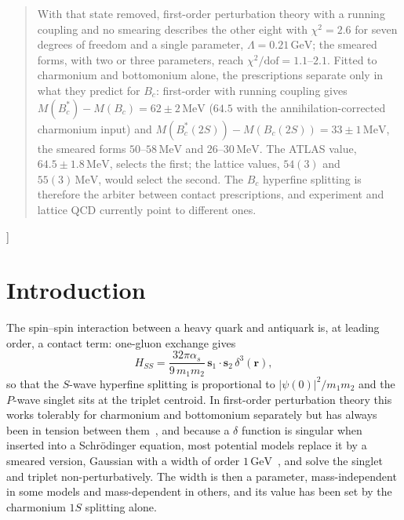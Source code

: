 \documentclass[10pt,twocolumn]{article}
\newcommand{\Bc}{B_c}
\newcommand{\Bcs}{B_c^*}
\newcommand{\MeV}{\,\mathrm{MeV}}
\newcommand{\GeV}{\,\mathrm{GeV}}
\begin{document}
\begin{@twocolumnfalse}
\begin{quote}
With that state removed, first-order perturbation theory with a running coupling and no smearing describes the other eight with $\chi^2=2.6$ for seven degrees of freedom and a single parameter, $\Lambda=0.21\GeV$; the smeared forms, with two or three parameters, reach $\chi^2/\mathrm{dof}=1.1$--$2.1$.
Fitted to charmonium and bottomonium alone, the prescriptions separate only in what they predict for $\Bc$: first-order with running coupling gives $M(\Bcs)-M(\Bc)=62\pm2\MeV$ ($64.5$ with the annihilation-corrected charmonium input) and $M(\Bcs(2S))-M(\Bc(2S))=33\pm1\MeV$, the smeared forms $50$--$58\MeV$ and $26$--$30\MeV$.
The ATLAS value, $64.5\pm1.8\MeV$, selects the first; the lattice values, $54(3)$ and $55(3)\MeV$, would select the second.
The $\Bc$ hyperfine splitting is therefore the arbiter between contact prescriptions, and experiment and lattice QCD currently point to different ones.
\end{quote}
\vspace{6pt}
\end{@twocolumnfalse}
]

\section{Introduction}
\label{sec:intro}

The spin--spin interaction between a heavy quark and antiquark is, at leading order, a contact term: one-gluon exchange gives
\begin{equation}
  H_{SS}=\frac{32\pi\alpha_s}{9\,m_1m_2}\,\mathbf s_1\!\cdot\!\mathbf s_2\,\delta^3(\mathbf r),
  \label{eq:hss}
\end{equation}
so that the $S$-wave hyperfine splitting is proportional to $|\psi(0)|^2/m_1m_2$ and the $P$-wave singlet sits at the triplet centroid.
In first-order perturbation theory this works tolerably for charmonium and bottomonium separately but has always been in tension between them~\cite{Eichten1994,Godfrey1985}, and because a $\delta$ function is singular when inserted into a Schrödinger equation, most potential models replace it by a smeared version, Gaussian with a width of order $1\GeV$~\cite{Godfrey1985,BGS2005}, and solve the singlet and triplet non-perturbatively.
The width is then a parameter, mass-independent in some models and mass-dependent in others, and its value has been set by the charmonium $1S$ splitting alone.
\end{document}
